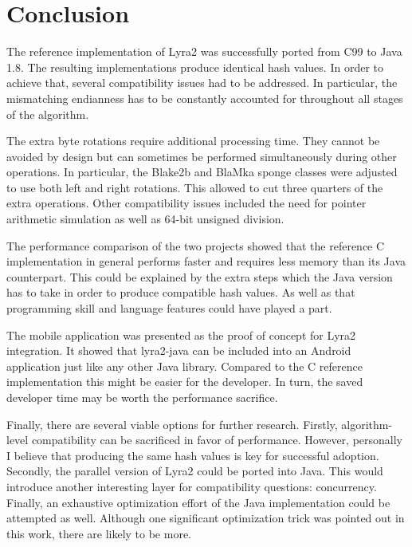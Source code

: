 \chapter{Conclusion}
\label{sec:conclusion}

The reference implementation of Lyra2 was successfully ported from C99 to Java 1.8. The resulting implementations produce identical hash values. In order to achieve that, several compatibility issues had to be addressed. In particular, the mismatching endianness has to be constantly accounted for throughout all stages of the algorithm.

The extra byte rotations require additional processing time. They cannot be avoided by design but can sometimes be performed simultaneously during other operations. In particular, the Blake2b and BlaMka sponge classes were adjusted to use both left and right rotations. This allowed to cut three quarters of the extra operations. Other compatibility issues included the need for pointer arithmetic simulation as well as 64-bit unsigned division.

The performance comparison of the two projects showed that the reference C implementation in general performs faster and requires less memory than its Java counterpart. This could be explained by the extra steps which the Java version has to take in order to produce compatible hash values. As well as that programming skill and language features could have played a part.

The mobile application was presented as the proof of concept for Lyra2 integration. It showed that lyra2-java can be included into an Android application just like any other Java library. Compared to the C reference implementation this might be easier for the developer. In turn, the saved developer time may be worth the performance sacrifice.

Finally, there are several viable options for further research. Firstly, algorithm-level compatibility can be sacrificed in favor of performance. However, personally I believe that producing the same hash values is key for successful adoption. Secondly, the parallel version of Lyra2 could be ported into Java. This would introduce another interesting layer for compatibility questions: concurrency. Finally, an exhaustive optimization effort of the Java implementation could be attempted as well. Although one significant optimization trick was pointed out in this work, there are likely to be more.
